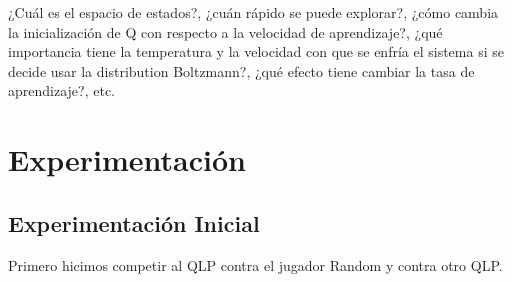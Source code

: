\documentclass[10pt, a4paper]{article}
\begin{document}
¿Cuál es el espacio de estados?, ¿cuán rápido se puede explorar?, ¿cómo cambia la inicialización de Q con respecto a la velocidad de aprendizaje?, ¿qué importancia tiene la temperatura y la velocidad con que se enfría el sistema si se decide usar la distribution Boltzmann?, ¿qué efecto tiene cambiar la tasa de aprendizaje?, etc.

\section{Experimentación}

\subsection{Experimentación Inicial}

Primero hicimos competir al QLP contra el jugador Random y contra otro QLP.
\end{document}
